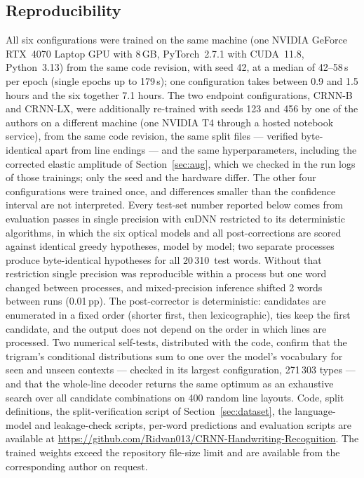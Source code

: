 \documentclass{ws-ijprai}
\newcommand{\ours}{CRNN-LX}            %
\newcommand{\nsamples}{20\,310}
\begin{document}
\subsection{Reproducibility}
All six configurations were trained on the same machine (one NVIDIA
GeForce RTX~4070 Laptop GPU with 8\,GB, PyTorch~2.7.1 with CUDA~11.8,
Python~3.13) from the same code revision, with seed 42, at a median of
42--58\,s per epoch (single epochs up to 179\,s); one configuration takes
between 0.9 and 1.5 hours and the six together 7.1 hours. The two endpoint
configurations, CRNN-B and \ours, were additionally re-trained with
seeds 123 and 456 by one of the authors on a different machine (one
NVIDIA T4 through a hosted notebook service), from the same code
revision, the same split files --- verified byte-identical apart from
line endings --- and the same hyperparameters, including the corrected
elastic amplitude of Section~\ref{sec:aug}, which we checked in the
run logs of those trainings; only the seed and the hardware differ. The other four configurations were trained
once, and differences smaller than the confidence interval are not
interpreted. Every test-set number
reported below comes from evaluation passes in single precision with
cuDNN restricted to its deterministic algorithms, in which the six
optical models and all post-corrections are scored against identical
greedy hypotheses, model by model; two separate processes produce byte-identical
hypotheses for all \nsamples\ test words. Without that restriction
single precision was reproducible within a process but one word
changed between processes, and mixed-precision inference shifted 2
words between runs (0.01\,pp). The post-corrector is deterministic: candidates are
enumerated in a fixed order (shorter first, then lexicographic), ties
keep the first candidate, and the output does not depend on the order
in which lines are processed. Two numerical self-tests, distributed
with the code, confirm that the trigram's conditional distributions sum
to one over the model's vocabulary for seen and unseen contexts --- checked
in its largest configuration, 271\,303 types ---
and that the whole-line decoder returns the same optimum as an
exhaustive search over all candidate combinations on 400 random line
layouts. Code, split
definitions, the split-verification script of Section~\ref{sec:dataset}, the
language-model and leakage-check scripts, per-word predictions and evaluation
scripts are available at
\url{https://github.com/Ridvan013/CRNN-Handwriting-Recognition}.
The trained weights exceed the repository file-size limit and are
available from the corresponding author on request.
\end{document}

